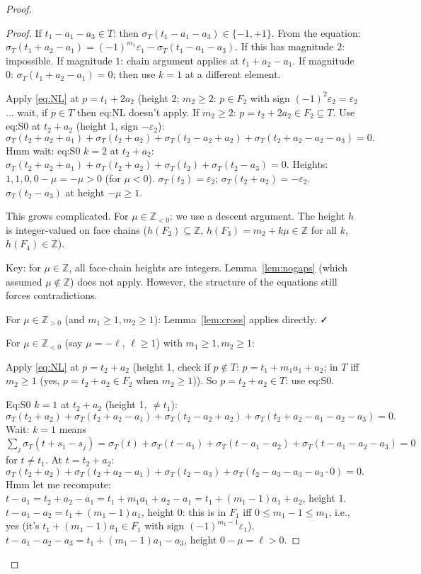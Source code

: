 \begin{proof}
\begin{proof}
If $t_1-a_1-a_3 \in T$: then $\sigma_T(t_1-a_1-a_3) \in \{-1,+1\}$. From the equation: $\sigma_T(t_1+a_2-a_1)=(-1)^{m_1}\varepsilon_1-\sigma_T(t_1-a_1-a_3)$. If this has magnitude $2$: impossible. If magnitude $1$: chain argument applies at $t_1+a_2-a_1$. If magnitude $0$: $\sigma_T(t_1+a_2-a_1)=0$; then use $k=1$ at a different element.

Apply \eqref{eq:NL} at $p=t_1+2a_2$ (height 2; $m_2\geq 2$: $p\in F_2$ with sign $(-1)^2\varepsilon_2=\varepsilon_2$... wait, if $p\in T$ then eq:NL doesn't apply. If $m_2\geq 2$: $p=t_2+2a_2\in F_2\subseteq T$. Use eq:S0 at $t_2+a_2$ (height 1, sign $-\varepsilon_2$):
\[
  \sigma_T(t_2+a_2+a_1)+\sigma_T(t_2+a_2)+\sigma_T(t_2-a_2+a_2)+\sigma_T(t_2+a_2-a_2-a_3)=0.
\]
Hmm wait: eq:S0 $k=2$ at $t_2+a_2$: $\sigma_T(t_2+a_2+a_1)+\sigma_T(t_2+a_2)+\sigma_T(t_2)+\sigma_T(t_2-a_3)=0$. Heights: $1,1,0,0-\mu=-\mu>0$ (for $\mu<0$). $\sigma_T(t_2)=\varepsilon_2$; $\sigma_T(t_2+a_2)=-\varepsilon_2$. $\sigma_T(t_2-a_3)$ at height $-\mu\geq 1$.

This grows complicated. For $\mu \in \mathbb{Z}_{<0}$: we use a descent argument. The height $h$ is integer-valued on face chains ($h(F_2) \subseteq \mathbb{Z}$, $h(F_3) = m_2+k\mu \in \mathbb{Z}$ for all $k$, $h(F_4) \in \mathbb{Z}$).

Key: for $\mu \in \mathbb{Z}$, all face-chain heights are integers. Lemma~\ref{lem:nogaps} (which assumed $\mu \notin \mathbb{Z}$) does not apply. However, the structure of the equations still forces contradictions.

For $\mu \in \mathbb{Z}_{>0}$ (and $m_1\geq 1,m_2\geq 1$): Lemma~\ref{lem:cross} applies directly. ✓

For $\mu \in \mathbb{Z}_{<0}$ (say $\mu=-\ell$, $\ell\geq 1$) with $m_1\geq 1,m_2\geq 1$:

Apply \eqref{eq:NL} at $p=t_2+a_2$ (height 1, check if $p\notin T$: $p = t_1+m_1a_1+a_2$; in $T$ iff $m_2\geq 1$ (yes, $p=t_2+a_2\in F_2$ when $m_2\geq 1$)). So $p=t_2+a_2\in T$: use eq:S0.

Eq:S0 $k=1$ at $t_2+a_2$ (height 1, $\neq t_1$):
\[
  \sigma_T(t_2+a_2)+\sigma_T(t_2+a_2-a_1)+\sigma_T(t_2-a_2+a_2)+\sigma_T(t_2+a_2-a_1-a_2-a_3)=0.
\]
Wait: $k=1$ means $\sum_j \sigma_T(t+s_1-s_j) = \sigma_T(t) + \sigma_T(t-a_1) + \sigma_T(t-a_1-a_2)+\sigma_T(t-a_1-a_2-a_3)=0$ for $t \neq t_1$. At $t=t_2+a_2$:
\[
  \sigma_T(t_2+a_2)+\sigma_T(t_2+a_2-a_1)+\sigma_T(t_2-a_3)+\sigma_T(t_2-a_3-a_3-a_3\cdot0)=0.
\]
Hmm let me recompute: $t - a_1 = t_2+a_2-a_1 = t_1+m_1a_1+a_2-a_1 = t_1+(m_1-1)a_1+a_2$, height $1$. $t-a_1-a_2 = t_1+(m_1-1)a_1$, height $0$: this is in $F_1$ iff $0\leq m_1-1\leq m_1$, i.e., yes (it's $t_1+(m_1-1)a_1\in F_1$ with sign $(-1)^{m_1-1}\varepsilon_1$). $t-a_1-a_2-a_3 = t_1+(m_1-1)a_1-a_3$, height $0-\mu=\ell>0$.


\end{proof}
\end{proof}
